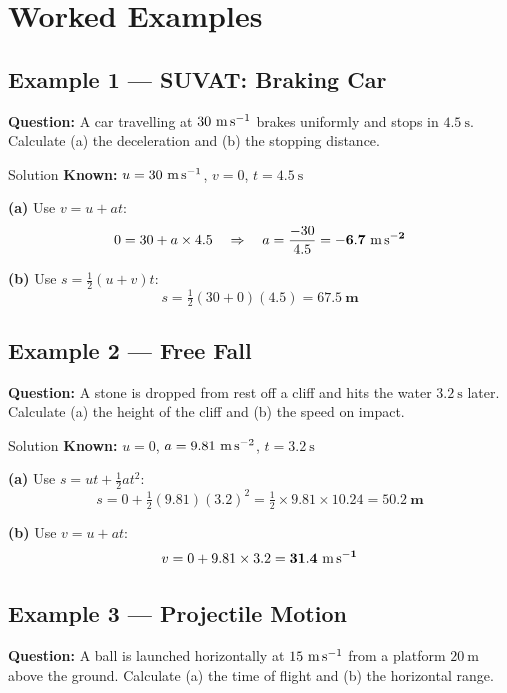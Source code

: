 \pagebreak

\section{Worked Examples}

\subsection*{Example 1 — SUVAT: Braking Car}

\textbf{Question:} A car travelling at $30\ \text{m\,s}^{-1}$ brakes uniformly and stops in $4.5\ \text{s}$. Calculate (a) the deceleration and (b) the stopping distance.

\begin{examplebox}{Solution}
\textbf{Known:} $u = 30\ \text{m\,s}^{-1}$, $v = 0$, $t = 4.5\ \text{s}$

\textbf{(a)} Use $v = u + at$:
$$0 = 30 + a \times 4.5 \quad \Rightarrow \quad a = \frac{-30}{4.5} = \mathbf{-6.7\ \text{m\,s}^{-2}}$$

\textbf{(b)} Use $s = \tfrac{1}{2}(u+v)t$:
$$s = \tfrac{1}{2}(30 + 0)(4.5) = \mathbf{67.5\ \text{m}}$$
\end{examplebox}

\subsection*{Example 2 — Free Fall}

\textbf{Question:} A stone is dropped from rest off a cliff and hits the water $3.2\ \text{s}$ later. Calculate (a) the height of the cliff and (b) the speed on impact.

\begin{examplebox}{Solution}
\textbf{Known:} $u = 0$, $a = 9.81\ \text{m\,s}^{-2}$, $t = 3.2\ \text{s}$

\textbf{(a)} Use $s = ut + \tfrac{1}{2}at^2$:
$$s = 0 + \tfrac{1}{2}(9.81)(3.2)^2 = \tfrac{1}{2} \times 9.81 \times 10.24 = \mathbf{50.2\ \text{m}}$$

\textbf{(b)} Use $v = u + at$:
$$v = 0 + 9.81 \times 3.2 = \mathbf{31.4\ \text{m\,s}^{-1}}$$
\end{examplebox}

\subsection*{Example 3 — Projectile Motion}

\textbf{Question:} A ball is launched horizontally at $15\ \text{m\,s}^{-1}$ from a platform $20\ \text{m}$ above the ground. Calculate (a) the time of flight and (b) the horizontal range.


